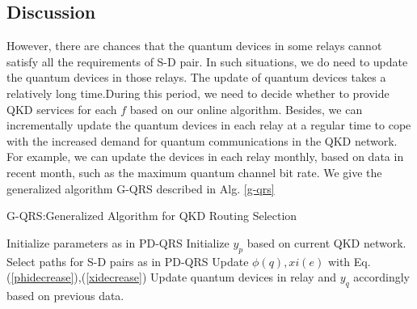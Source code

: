 \subsection{Discussion}
However, there are chances that the quantum devices in some relays cannot satisfy all the requirements of S-D pair. In such situations, we do need to update the quantum devices in those relays. The update of quantum devices takes a relatively long time.During this period, we need to decide whether to provide QKD services for each $f$ based on our online algorithm. Besides, we can incrementally update the quantum devices in each relay at a regular time to cope with the increased demand for quantum communications in the QKD network. For example, we can update the devices in each relay monthly, based on data in recent month, such as the maximum quantum channel bit rate. We give the generalized algorithm G-QRS described in Alg. \ref{g-qrs}

\begin{algorithm}[h]\label{g-qrs}
\caption{G-QRS:Generalized Algorithm for QKD Routing Selection}
\begin{algorithmic}[1]
\STATE  Initialize parameters as in PD-QRS
\STATE Initialize $y_p$ based on current QKD network.
\STATE Select paths for S-D pairs as in PD-QRS
\STATE Update $\phi(q),xi(e)$ with Eq.(\ref{phidecrease}),(\ref{xidecrease})
\STATE Update quantum devices in relay and $y_q$ accordingly based on previous data.
\end{algorithmic}
\end{algorithm}

